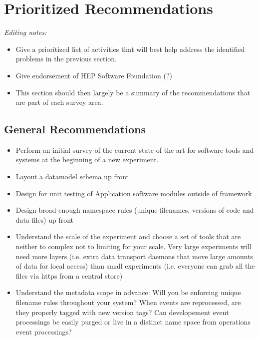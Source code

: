 \section{Prioritized Recommendations}


\textit{Editing notes:}
\begin{itemize}
\item Give a prioritized list of activities that will best help address the identified problems in the previous section. 
\item Give endorsement of HEP Software Foundation (?)
\item This section should then largely be a summary of the recommendations that are part of each survey area.
\end{itemize}
\subsection{General Recommendations}
\begin{itemize}
\item Perform an initial survey of the current state of the art for software tools and systems at the beginning of a new experiment.
\item Layout a datamodel schema up front
\item Design for unit testing of Application software modules outside of framework
\item Design broad-enough namespace rules (unique filenames, versions of code and data files) up front
\item Understand the scale of the experiment and choose a set of tools that
are neither to complex not to limiting for your scale.  Very large experiments will need more layers (i.e. extra data transport daemons that move large amounts of data for local access) than small experiments (i.e. everyone can grab all the files via https from a central store)
\item Understand the metadata scope in advance: Will you be enforcing unique filename rules throughout your system?  When events are reprocessed, are they properly tagged with new version tags?  Can developement event processings be easily
purged or live in a distinct name space from operations event processings?
\end{itemize}
